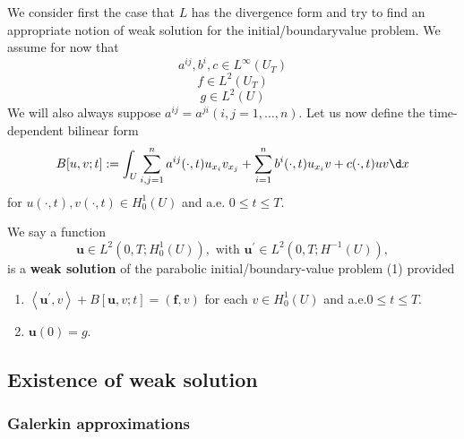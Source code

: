 \begin{definition}
    We consider first the case that $L$ has the divergence form and try to find an appropriate notion of weak solution for the initial/boundaryvalue problem.
    We assume for now that
    \begin{equation*}
        a^{i j}, b^i, c \in L^{\infty}\left(U_T\right)
    \end{equation*}
    \begin{equation*}
        f \in L^2\left(U_T\right)
    \end{equation*}
    \begin{equation*}
        g \in L^2(U)
    \end{equation*}
    We will also always suppose $a^{i j}=a^{j i}(i, j=1, \ldots, n)$.
    Let us now define the time-dependent bilinear form
    \begin{equation*}
        B[u, v ; t]
        :=
        \int_U \sum_{i, j=1}^n a^{i j}(\cdot, t) u_{x_i} v_{x_j}+\sum_{i=1}^n b^i(\cdot, t) u_{x_i} v+c(\cdot, t) u v \d x
    \end{equation*}
    for $u\left(\cdot,t\right), v\left(\cdot,t\right) \in H_0^1(U)$ and a.e. $0 \leq t \leq T$.

    We say a function
    \begin{equation*}
        \mathbf{u} \in L^2\left(0, T ; H_0^1(U)\right), \text { with } \mathbf{u}^{\prime} \in L^2\left(0, T ; H^{-1}(U)\right),
    \end{equation*}
    is a \textbf{weak solution} of the parabolic initial/boundary-value problem (1) provided

    \begin{enumerate}
        \item
              $\left\langle\mathbf{u}^{\prime}, v\right\rangle+B[\mathbf{u}, v ; t]=(\mathbf{f}, v)$
              for each $v \in H_0^1(U)$ and a.e.$0 \leq t \leq T$.

        \item
              $\mathbf{u}(0)=g$.
    \end{enumerate}
\end{definition}


\subsection{Existence of weak solution}

\subsubsection{Galerkin approximations}

